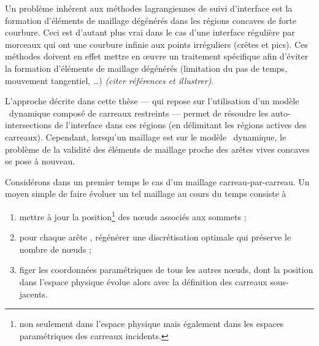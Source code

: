 Un problème inhérent aux méthodes lagrangiennes de suivi d'interface est la formation d'éléments de maillage dégénérés dans les régions concaves de forte courbure. 
Ceci est d'autant plus vrai dans le cas d'une interface régulière par morceaux qui ont une courbure infinie aux points irréguliers (crêtes et pics). Ces méthodes doivent en effet mettre en \oe uvre un traitement spécifique afin d'éviter la formation d'éléments de maillage dégénérés (limitation du pas de temps, mouvement tangentiel, \ldots) \textit{(citer références et illustrer)}.\par 
L'approche décrite dans cette thèse --- qui repose sur l'utilisation d'un modèle \brep\ dynamique composé de carreaux restreints --- permet de résoudre les auto-intersections de l'interface dans ces régions (en délimitant les régions actives des carreaux). 
Cependant, lorsqu'un maillage est  sur le modèle \brep\ dynamique, le problème de la validité des éléments de maillage proche des arêtes vives concaves se pose à nouveau.
\par
%
Considérons dans un premier temps le cas d'un maillage carreau-par-carreau. 
Un moyen simple de faire évoluer un tel maillage au cours du temps consiste à %
\begin{enumerate}
	\item mettre à jour la position\footnote{\label{foot:position_uv_xyz}non seulement dans l'espace physique mais également dans les espaces paramétriques des carreaux incidents.} des n\oe uds associés aux sommets ;
	\item pour chaque arête \brep, régénérer une discrétisation optimale qui préserve le nombre de n\oe uds ;
	\item figer les coordonnées paramétriques de tous les autres n\oe uds, dont la position dans l'espace physique évolue alors avec la définition des carreaux sous-jacents.
\end{enumerate}
